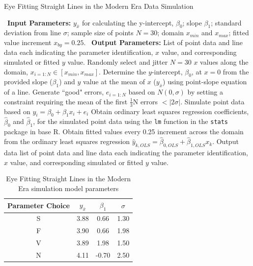 \documentclass[print]{nuthesis}
\begin{document}
\begin{algorithm}
  \caption{Eye Fitting Straight Lines in the Modern Era Data Simulation}\label{alg:eyefitting-algorithm}
  \begin{algorithmic}[1]
    \Statex \textbullet~\textbf{Input Parameters:} $y_{\bar{x}}$ for calculating the y-intercept, $\beta_0$; slope $\beta_1$; standard deviation from line $\sigma$; sample size of points $N = 30$; domain $x_{min}$ and $x_{max}$; fitted value increment $x_{by} = 0.25$.
    \Statex \textbullet~\textbf{Output Parameters:} List of point data and line data each indicating the parameter identification, $x$ value, and corresponding simulated or fitted $y$ value.
    \State Randomly select and jitter $N = 30$ $x$ values along the domain, $x_{i=1:N}\in [x_{min}, x_{max}]$.
    \State Determine the $y$-intercept, $\beta_0$, at $x = 0$ from the provided slope ($\beta_1$) and $y$ value at the mean of $x$ ($y_{\bar{x}}$) using point-slope equation of a line.
    \State Generate ``good" errors, $e_{i = 1:N}$ based on $N(0,\sigma)$ by setting a constraint requiring the mean of the first $\frac{1}{3}\text{N}$ errors $< |2\sigma|.$
    \State Simulate point data based on $y_i = \beta_0 + \beta_1 x_i + e_i$
    \State Obtain ordinary least squares regression coefficients, $\hat\beta_0$ and $\hat\beta_1$, for the simulated point data using the \texttt{lm} function in the \texttt{stats} package in base R.
    \State Obtain fitted values every 0.25 increment across the domain from the ordinary least squares regression $\hat y_{k,OLS} = \hat\beta_{0,OLS} + \hat\beta_{1,OLS} x_k$.
    \State Output data list of point data and line data each indicating the parameter identification, $x$ value, and corresponding simulated or fitted $y$ value.
  \end{algorithmic}
\end{algorithm}

\begin{table}

\caption{\label{tab:eyefitting-parameters}Eye Fitting Straight Lines in the Modern Era simulation model parameters}
\centering
\begin{tabular}[t]{cccc}
\toprule
Parameter Choice & $y_{\bar{x}}$ & $\beta_1$ & $\sigma$\\
\midrule
S & 3.88 & 0.66 & 1.30\\
F & 3.90 & 0.66 & 1.98\\
V & 3.89 & 1.98 & 1.50\\
N & 4.11 & -0.70 & 2.50\\
\bottomrule
\end{tabular}
\end{table}
\end{document}
